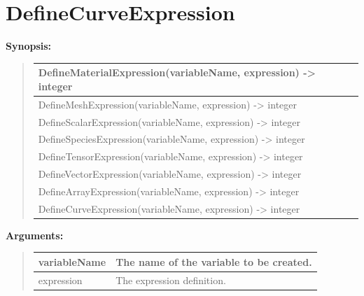 \documentclass[letterpaper,10pt,english]{sphinxmanual}
\begin{document}
\section{DefineCurveExpression}
\label{functions:definecurveexpression}
\begin{DUlineblock}{0em}
\item[] \textbf{Synopsis:}
\end{DUlineblock}
\begin{quote}

\begin{tabulary}{\linewidth}{|L|}
\hline

DefineMaterialExpression(variableName, expression) -\textgreater{} integer
\\
\hline
DefineMeshExpression(variableName, expression) -\textgreater{} integer
\\
\hline
DefineScalarExpression(variableName, expression) -\textgreater{} integer
\\
\hline
DefineSpeciesExpression(variableName, expression) -\textgreater{} integer
\\
\hline
DefineTensorExpression(variableName, expression) -\textgreater{} integer
\\
\hline
DefineVectorExpression(variableName, expression) -\textgreater{} integer
\\
\hline
DefineArrayExpression(variableName, expression) -\textgreater{} integer
\\
\hline
DefineCurveExpression(variableName, expression) -\textgreater{} integer
\\
\hline\end{tabulary}

\end{quote}

\begin{DUlineblock}{0em}
\item[] 
\item[] \textbf{Arguments:}
\end{DUlineblock}
\begin{quote}

\begin{tabulary}{\linewidth}{|L|L|}
\hline

variableName
 & 
The name of the variable to be created.
\\
\hline
expression
 & 
The expression definition.
\\
\hline\end{tabulary}

\end{quote}
\end{document}
